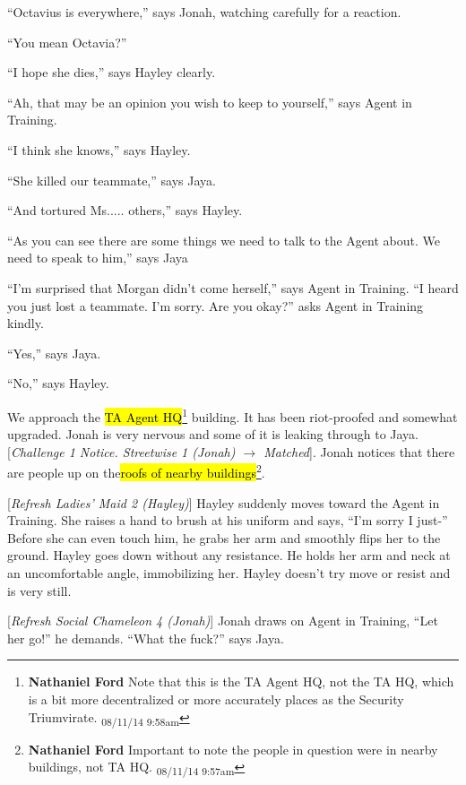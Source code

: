 ``Octavius is everywhere,'' says Jonah, watching carefully for a reaction.

``You mean Octavia?''

``I hope she dies,'' says Hayley clearly.

``Ah, that may be an opinion you wish to keep to yourself,'' says Agent in Training.

``I think she knows,'' says Hayley.

``She killed our teammate,'' says Jaya.

``And tortured Ms..... others,'' says Hayley.

``As you can see there are some things we need to talk to the Agent about.  We need to speak to him,'' says Jaya

``I'm surprised that Morgan didn't come herself,'' says Agent in Training.  ``I heard you just lost a teammate.  I'm sorry.  Are you okay?'' asks Agent in Training kindly.

``Yes,'' says Jaya.

``No,'' says Hayley.



We approach the \hl{TA Agent HQ}\footnote{\textbf{Nathaniel Ford }Note that this is the TA Agent HQ, not the TA HQ, which is a bit more decentralized or more accurately places as the Security Triumvirate. \textsubscript{08/11/14 9:58am}} building.  It has been riot-proofed and somewhat upgraded.  Jonah is very nervous and some of it is leaking through to Jaya.  {[}\textit{Challenge 1 Notice.  Streetwise 1 (Jonah) $\rightarrow$ Matched}{]}.  Jonah notices that there are people up on the\hl{roofs of nearby buildings}\footnote{\textbf{Nathaniel Ford }Important to note the people in question were in nearby buildings, not TA HQ. \textsubscript{08/11/14 9:57am}}.



{[}\textit{Refresh Ladies' Maid 2 (Hayley)}{]} Hayley suddenly moves toward the Agent in Training.  She raises a hand to brush at his uniform and says, ``I'm sorry I just-''  Before she can even touch him, he grabs her arm and smoothly flips her to the ground.  Hayley goes down without any resistance.  He holds her arm and neck at an uncomfortable angle, immobilizing her.  Hayley doesn't try move or resist and is very still. 



{[}\textit{Refresh Social Chameleon 4 (Jonah)}{]} Jonah draws on Agent in Training, ``Let her go!'' he demands.  ``What the fuck?'' says Jaya.  

